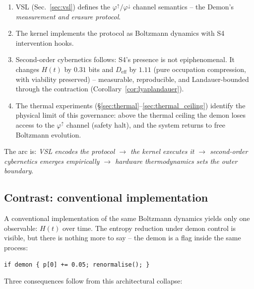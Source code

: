 \documentclass[11pt, a4paper]{article}
\begin{document}
\begin{enumerate}
  \item VSL (Sec.~\ref{sec:vsl}) defines the $\varphi^\uparrow / \varphi^\downarrow$
    channel semantics -- the Demon's \emph{measurement and erasure protocol}.
  \item The kernel implements the protocol as Boltzmann dynamics with
    S4 intervention hooks.
  \item Second-order cybernetics follows: S4's presence is not epiphenomenal.
    It changes $H(t)$ by $0.31$ bits and $D_\text{eff}$ by $1.11$ (pure occupation
    compression, with viability preserved) -- measurable, reproducible, and
    Landauer-bounded through the contraction (Corollary~\ref{cor:lyaplandauer}).
  \item The thermal experiments (\S\ref{sec:thermal}--\ref{sec:thermal_ceiling})
    identify the physical limit of this governance: above the thermal ceiling
    the demon loses access to the $\varphi^\uparrow$ channel (safety halt),
    and the system returns to free Boltzmann evolution.
\end{enumerate}

The arc is: \emph{VSL encodes the protocol $\to$ the kernel executes it $\to$
second-order cybernetics emerges empirically $\to$ hardware thermodynamics sets
the outer boundary}.

\subsection{Contrast: conventional implementation}

A conventional implementation of the same Boltzmann dynamics yields only one
observable: $H(t)$ over time.
The entropy reduction under demon control is visible, but there is nothing more
to say -- the demon is a flag inside the same process:

\begin{center}
\texttt{if demon \{ p[0] += 0.05; renormalise(); \}}
\end{center}

Three consequences follow from this architectural collapse:
\end{document}
